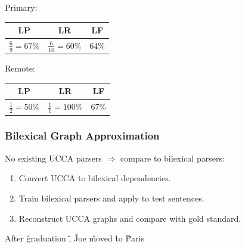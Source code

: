 \documentclass[t]{beamer}
\begin{document}
\begin{frame}
\begin{adjustbox}{frame,scale=.75,center}
\begin{tikzpicture}[level distance=15mm, sibling distance=15mm, ->,
	    every circle node/.append style={fill=black}]
	\end{tikzpicture}
\end{adjustbox}
\vfill
\begin{adjustbox}{scale=.75,center}
	Primary:
	\begin{tabular}{ccc}
		\textbf{LP} & \textbf{LR} & \textbf{LF} \\ \hline
		$\frac69=67\%$ & $\frac6{10}=60\%$ & 64\%
	\end{tabular}
	\hspace{1cm}
	Remote:
	\begin{tabular}{ccc}
		\textbf{LP} & \textbf{LR} & \textbf{LF} \\ \hline
		$\frac12=50\%$ & $\frac11=100\%$ & 67\%
	\end{tabular}
\end{adjustbox}
\end{frame}

\begin{frame}
\frametitle{Bilexical Graph Approximation}
No existing UCCA parsers $\Rightarrow$ compare to bilexical parsers:
\begin{enumerate}
 \item Convert UCCA to bilexical dependencies.
 \item Train bilexical parsers and apply to test sentences.
 \item Reconstruct UCCA graphs and compare with gold standard.
\end{enumerate}
\vfill

\begin{center}
	\begin{dependency}
	\begin{deptext}[column sep=.7em,ampersand replacement=\^,font=\rmfamily]
	After \^ graduation \^ , \^ Joe \^ moved \^ to \^ Paris \\
	\end{deptext}
	\end{dependency}
\end{center}
\end{frame}
\end{document}
